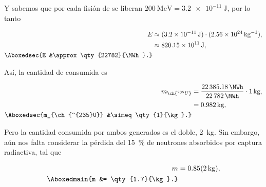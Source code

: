 \documentclass[./../main.tex]{subfiles}
\begin{document}
\begin{exercise}
\begin{solution}
            Y sabemos que por cada fisión de  se liberan \(\qty{200}{\MeV} = \qty{3.2e-11}{\J}\), por lo tanto

            \begin{align*}
                E &\approx (\qty{3.2e-11}{\J})\cdot(\qty{2.56e24}{\per\kg}),\\
                &\approx \qty{820.15e11}{\J},\\
                \Aboxedsec{E &\approx \qty{22782}{\MWh}.}
            \end{align*}

            Así, la cantidad de  consumida es

            \begin{align*}
                m_{\ch{^{235}U}} &= \dfrac{\qty{22385.18}{\MWh}}{\qty{22782}{\MWh}}\cdot \qty{1}{\kg},\\
                &= \qty{0.982}{\kg},\\
                \Aboxedsec{m_{\ch{^{235}U}} &\simeq \qty{1}{\kg}.}
            \end{align*}

            Pero la cantidad consumida por ambos generados es el doble, \idest \qty{2}{\kg}. Sin embargo, aún nos falta considerar la pérdida del \qty{15}{\percent} de neutrones absorbidos por captura radiactiva, tal que

            \begin{align*}
                m &= 0.85(\qty{2}{\kg}),\\
                \Aboxedmain{m &= \qty{1.7}{\kg}.}
            \end{align*}
        \end{solution}
    \end{exercise}
\end{document}
